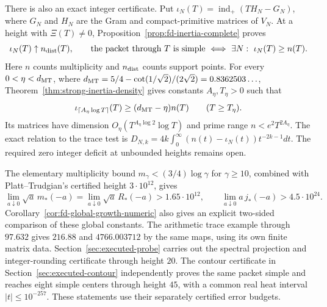 There is also an exact integer certificate. Put
\(\iota_N(T)=\operatorname{ind}_+(T H_N-G_N)\), where
\(G_N\) and \(H_N\) are the Gram and compact-primitive matrices
of \(V_N\). At a height with \(\Xi(T)\ne0\),
Proposition~\ref{prop:fd-inertia-complete} proves
\[
 \iota_N(T)\uparrow n_{\rm dist}(T),
 \qquad
 \text{the packet through }T\text{ is simple}
 \ \Longleftrightarrow\ \exists N:\ \iota_N(T)\ge n(T).
\]
Here \(n\) counts multiplicity and \(n_{\rm dist}\) counts
support points. For every \(0<\eta<d_{\rm MT}\), where
\(d_{\rm MT}=5/4-\cot(1/\sqrt2)/(2\sqrt2)=0.8362503\ldots\),
Theorem~\ref{thm:strong-inertia-density} gives constants
\(A_\eta,T_\eta>0\) such that
\[
 \iota_{\lceil A_\eta\log T\rceil}(T)
       \ge(d_{\rm MT}-\eta)n(T)\qquad(T\ge T_\eta).
\]
Its matrices have dimension
\(O_\eta(T^{A_\eta\log2}\log T)\) and prime range
\(n<e^2T^{2A_\eta}\). The exact relation to the trace test is
\(D_{N,k}=4k\int_0^\infty(n(t)-\iota_N(t))t^{-2k-1}dt\).
The required zero integer deficit at unbounded heights remains open.

The elementary multiplicity bound $m_\gamma<(3/4)\log\gamma$
for $\gamma\ge10$, combined with Platt--Trudgian's certified
height $3\cdot10^{12}$, gives
\[
 \lim_{a\downarrow0}\sqrt a\,m_*(-a)
 =\lim_{a\downarrow0}\sqrt a\,R_*(-a)>1.65\cdot10^{12},
 \qquad \lim_{a\downarrow0}a\,j_*(-a)>4.5\cdot10^{24}.
\]
Corollary~\ref{cor:fd-global-growth-numeric} also gives an explicit
two-sided comparison of these global constants. The arithmetic trace
example through $97.632$ gives $216.88$ and $4766.003712$ by the
same maps, using its own finite matrix data.
Section~\ref{sec:executed-probe} carries out the spectral projection
and integer-rounding certificate through height $20$.
The contour certificate in Section~\ref{sec:executed-contour}
independently proves the same packet simple and reaches eight simple
centers through height $45$, with a common real heat interval
$|t|\le10^{-257}$. These statements use their separately certified
error budgets.

